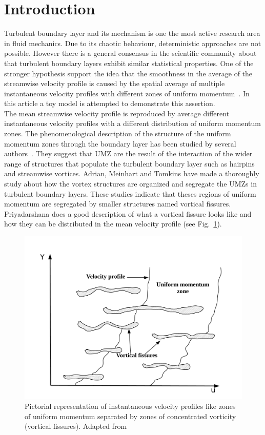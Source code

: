 \documentclass[aps,reprint,amsmath,amssymb,pra]{revtex4-1}%
\begin{document}
\section{\label{sec:intro} Introduction}
Turbulent boundary layer and its mechanism is one the most active research area in fluid mechanics. Due to its chaotic behaviour, deterministic approaches are not possible. However there is a general consensus in the scientific community about that turbulent boundary layers exhibit similar statistical properties. One of the stronger hypothesis  support the idea that the smoothness in the average of the streamwise velocity profile is caused by the spatial average of multiple instantaneous velocity profiles with different zones of uniform momentum~\citep{mca1995,umz2015}. In this article a toy model is attempted to demonstrate this assertion.\\
The mean streamwise velocity profile is reproduced by average different instantaneous velocity profiles with a different distribution of uniform momentum zones.
The phenomenological description of the structure of the uniform momentum zones through the boundary layer has been studied by several authors~\citep{nose}. They suggest that UMZ are the result of the interaction of the wider range of structures that populate the turbulent boundary layer\cite{2} such as hairpins and streamwise vortices. \cite{amt2000} Adrian, Meinhart and Tomkins have made a thoroughly  study about how the vortex structures are organized and segregate the UMZs in turbulent boundary layers.  These studies indicate that theses regions of uniform momentum are segregated by smaller structures named vortical fissures.\citep{priya2007} Priyadarshana does a good description of what a vortical fissure looks like and how they can be distributed in the mean velocity profile (see Fig.~\ref{fig:vortical_fissures}). 
\begin{figure}[b]
\includegraphics[scale=0.33]{figures/uniform_velocity_vortical_fissures}
\caption{\label{fig:vortical_fissures} Pictorial representation of instantaneous velocity profiles like zones of uniform momentum separated by zones of concentrated vorticity (vortical fissures).
Adapted from~\citep{priya2007}}
\end{figure} 
\end{document}
